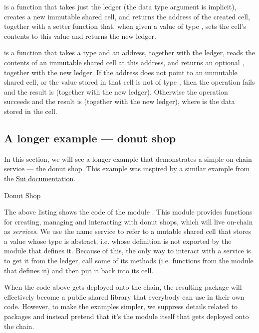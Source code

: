 

 is a function that takes just the ledger (the data type argument  is implicit), creates a new immutable shared cell, and returns the address of the created cell, together with a setter function that, when given a value of type , sets the cell's contents to this value and returns the new ledger.



 is a function that takes a type  and an address, together with the ledger, reads the contents of an immutable shared cell at this address, and returns an optional , together with the new ledger. If the address does not point to an immutable shared cell, or the value stored in that cell is not of type , then the operation fails and the result is  (together with the new ledger). Otherwise the operation succeeds and the result is  (together with the new ledger), where  is the data stored in the cell.

\subsection{A longer example --- donut shop}

In this section, we will see a longer example that demonstrates a simple on-chain service --- the donut shop. This example was inspired by a similar example from the \href{https://docs.sui.io/concepts/object-ownership/shared}{Sui documentation}.

\begin{example}{Donut Shop}



\end{example}

The above listing shows the code of the module . This module provides functions for creating, managing and interacting with donut shops, which will live on-chain as \textit{services}. We use the name service to refer to a mutable shared cell that stores a value whose type is abstract, i.e. whose definition is not exported by the module that defines it. Because of this, the only way to interact with a service is to get it from the ledger, call some of its methods (i.e. functions from the module that defines it) and then put it back into its cell.

When the code above gets deployed onto the chain, the resulting package will effectively become a public shared library that everybody can use in their own code. However, to make the examples simpler, we suppress details related to packages and instead pretend that it's the module itself that gets deployed onto the chain.

